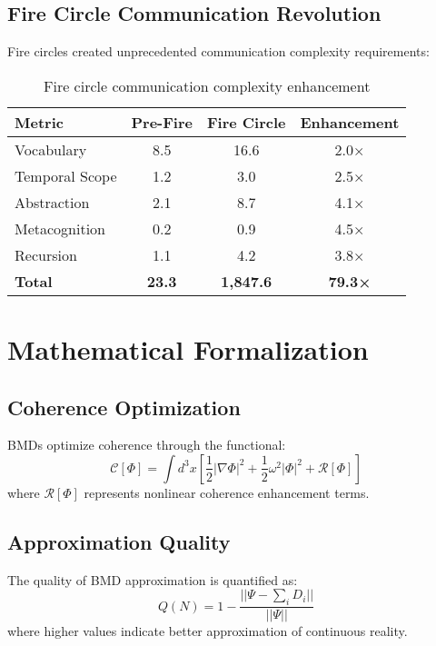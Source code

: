 \documentclass[11pt,twocolumn]{article}
\theoremstyle{remark}
\begin{document}
\subsection{Fire Circle Communication Revolution}

Fire circles created unprecedented communication complexity requirements:

\begin{table}[h]
\centering
\small
\begin{tabular}{lccc}
\toprule
\textbf{Metric} & \textbf{Pre-Fire} & \textbf{Fire Circle} & \textbf{Enhancement} \\
\midrule
Vocabulary & 8.5 & 16.6 & 2.0× \\
Temporal Scope & 1.2 & 3.0 & 2.5× \\
Abstraction & 2.1 & 8.7 & 4.1× \\
Metacognition & 0.2 & 0.9 & 4.5× \\
Recursion & 1.1 & 4.2 & 3.8× \\
\midrule
\textbf{Total} & \textbf{23.3} & \textbf{1,847.6} & \textbf{79.3×} \\
\bottomrule
\end{tabular}
\caption{Fire circle communication complexity enhancement}
\label{tab:fire_circle}
\end{table}

\section{Mathematical Formalization}

\subsection{Coherence Optimization}

BMDs optimize coherence through the functional:
\begin{equation}
\mathcal{C}[\Phi] = \int d^3x \left[\frac{1}{2}|\nabla\Phi|^2 + \frac{1}{2}\omega^2|\Phi|^2 + \mathcal{R}[\Phi]\right]
\end{equation}
where $\mathcal{R}[\Phi]$ represents nonlinear coherence enhancement terms.

\subsection{Approximation Quality}

The quality of BMD approximation is quantified as:
\begin{equation}
Q(N) = 1 - \frac{||\Psi - \sum_i D_i||}{||\Psi||}
\end{equation}
where higher values indicate better approximation of continuous reality.
\end{document}
